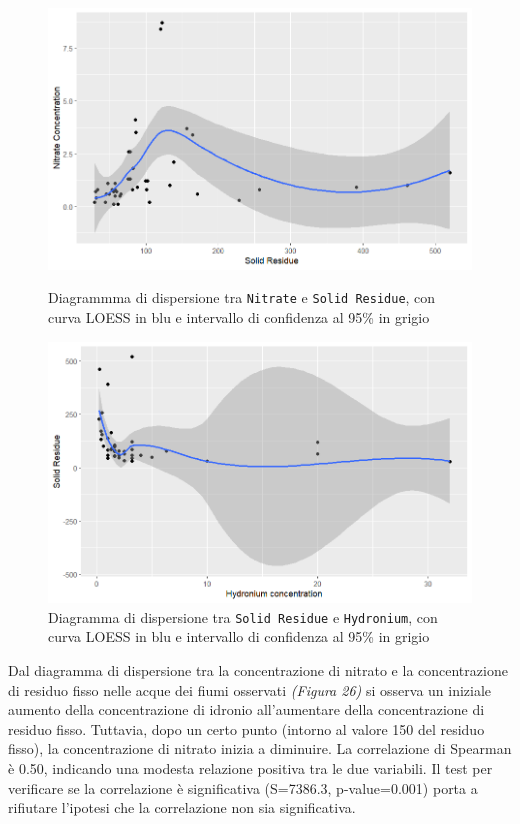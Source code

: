 \documentclass{article} %
\begin{document}
\begin{figure}[H]
    \centering
    \begin{minipage}{0.49\textwidth}
        \centering
        \includegraphics[width=\textwidth]{immagini/sr_nitrate.png}
        \captionsetup{justification=centering}
        \caption{Diagrammma di dispersione tra \texttt{Nitrate} e \texttt{Solid Residue}, con curva LOESS in blu e intervallo di confidenza al 95\% in grigio}
    \end{minipage}
    \hfill
    \begin{minipage}{0.49\textwidth}
        \centering
        \includegraphics[width=\textwidth]{immagini/sr_hy.png}
        \captionsetup{justification=centering}
        \caption{Diagramma di dispersione tra \texttt{Solid Residue} e \texttt{Hydronium}, con curva LOESS in blu e intervallo di confidenza al 95\% in grigio}
    \end{minipage}
\end{figure}

Dal diagramma di dispersione tra la concentrazione di nitrato e la concentrazione di residuo fisso nelle acque dei fiumi osservati \textit{(Figura 26)} si osserva un iniziale aumento della concentrazione di idronio all'aumentare della concentrazione di residuo fisso. Tuttavia, dopo un certo punto (intorno al valore 150 del residuo fisso), la concentrazione di nitrato inizia a diminuire.
La correlazione di Spearman è 0.50, indicando una modesta relazione positiva tra le due variabili. 
Il test per verificare se la correlazione è significativa (S=7386.3, p-value=0.001) porta a rifiutare l'ipotesi che la correlazione non sia significativa.
\end{document}
